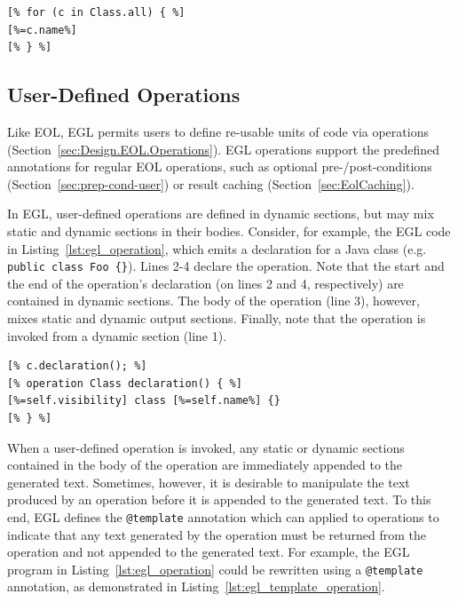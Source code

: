 \begin{lstlisting}[float=tbp, caption=Generating the name of each Class contained in an input model., label=lst:oo, language=EGL]
[% for (c in Class.all) { %]
[%=c.name%]
[% } %]
\end{lstlisting}

\subsection{User-Defined Operations}

Like EOL, EGL permits users to define re-usable units of code via
operations (Section~\ref{sec:Design.EOL.Operations}). EGL operations
support the predefined annotations for regular EOL operations, such as
optional pre-/post-conditions (Section~\ref{sec:prep-cond-user}) or
result caching (Section~\ref{sec:EolCaching}).

In EGL, user-defined operations are defined in dynamic sections, but may mix static and dynamic sections in their
bodies. Consider, for example, the EGL code in Listing~\ref{lst:egl_operation}, 
which emits a declaration for a Java class (e.g. \texttt{public class Foo \{\}}).
Lines 2-4 declare the operation. Note that the start and the end of the operation's 
declaration (on lines 2 and 4, respectively) are contained in dynamic sections. The
body of the operation (line 3), however, mixes static and dynamic output sections.
Finally, note that the operation is invoked from a dynamic section (line 1).

\begin{lstlisting}[float=tbp, caption=Using an operation to specify the text generated for a declaration of a Java class., label=lst:egl_operation, language=EGL]
[% c.declaration(); %]
[% operation Class declaration() { %]
[%=self.visibility] class [%=self.name%] {}
[% } %]
\end{lstlisting}

When a user-defined operation is invoked, any static or dynamic sections contained 
in the body of the operation are immediately appended to the generated text. Sometimes, 
however, it is desirable to manipulate the text produced by an operation before it is
appended to the generated text. To this end, EGL defines the \texttt{@template} annotation
which can applied to operations to indicate that any text generated by the operation
must be returned from the operation and not appended to the generated text. For example,
the EGL program in Listing~\ref{lst:egl_operation} could be rewritten using a \texttt{@template}
annotation, as demonstrated in Listing~\ref{lst:egl_template_operation}.

